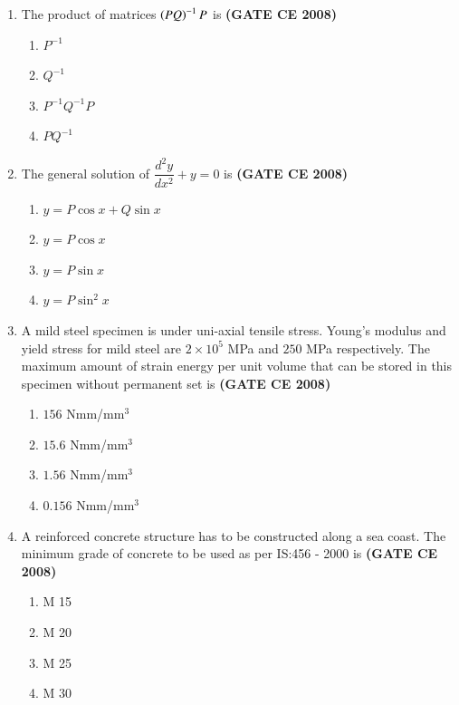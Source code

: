 \documentclass[journal]{IEEEtran}
\begin{document}
\begin{enumerate}
\item The product of matrices $\left(PQ\right)^{-1} P$ is \textbf{(GATE CE 2008)}
\begin{enumerate}
\item $P^{-1}$
\item $Q^{-1}$
\item $P^{-1}Q^{-1}P$
\item $PQ^{-1}$
\end{enumerate}


\item The general solution of $\dfrac{d^2y}{dx^2} + y = 0$ is  \textbf{(GATE CE 2008)}
\begin{multicols}{2}
\begin{enumerate}
\item $y = P \cos x + Q \sin x$ 
\item $y = P \cos x$ 
\item $y = P \sin x$
\item $y = P \sin^2 x$
\end{enumerate}
\end{multicols}

\item A mild steel specimen is under uni-axial tensile stress. Young's modulus and yield stress for mild steel are $2 \times 10^5$ MPa and $250$ MPa respectively. The maximum amount of strain energy per unit volume that can be stored in this specimen without permanent set is  \textbf{(GATE CE 2008)}

\begin{multicols}{2}
\begin{enumerate}
\item $156$ Nmm/mm$^3$ 
\item $15.6$ Nmm/mm$^3$ 
\item $1.56$ Nmm/mm$^3$ 
\item $0.156$ Nmm/mm$^3$
\end{enumerate}
\end{multicols}

\item A reinforced concrete structure has to be constructed along a sea coast. The minimum grade of concrete to be used as per IS:456 - 2000 is  \textbf{(GATE CE 2008)}
\begin{multicols}{4}
\begin{enumerate}
\item M 15 
\item M 20 
\item M 25 
\item M 30
\end{enumerate}
\end{multicols}


\end{enumerate}
\end{document}
